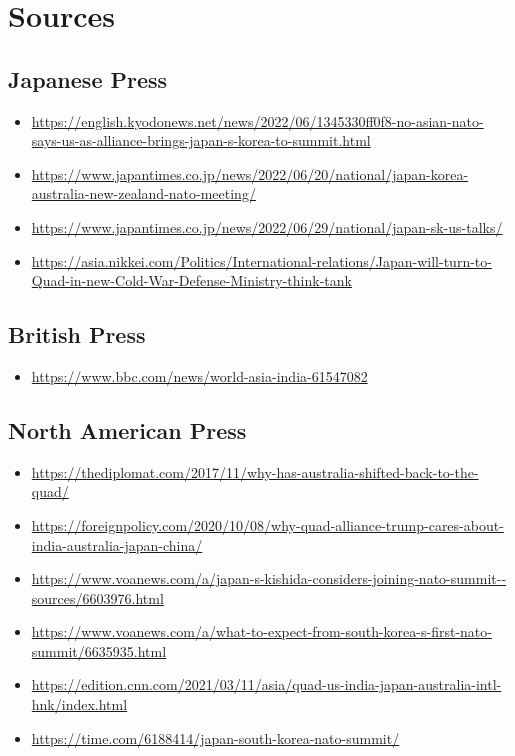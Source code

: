 \documentclass[11pt,a4paper]{article}
\begin{document}
\section{Sources}
\small

\subsection*{Japanese Press}
  \begin{itemize}[leftmargin=1.3em,itemsep=.18em,topsep=.25em]
    \item \url{https://english.kyodonews.net/news/2022/06/1345330ff0f8-no-asian-nato-says-us-as-alliance-brings-japan-s-korea-to-summit.html}
    \item \url{https://www.japantimes.co.jp/news/2022/06/20/national/japan-korea-australia-new-zealand-nato-meeting/}
    \item \url{https://www.japantimes.co.jp/news/2022/06/29/national/japan-sk-us-talks/}
    \item \url{https://asia.nikkei.com/Politics/International-relations/Japan-will-turn-to-Quad-in-new-Cold-War-Defense-Ministry-think-tank}
  \end{itemize}
\subsection*{British Press}
  \begin{itemize}[leftmargin=1.3em,itemsep=.18em,topsep=.25em]
    \item \url{https://www.bbc.com/news/world-asia-india-61547082}
  \end{itemize}
\subsection*{North American Press}
  \begin{itemize}[leftmargin=1.3em,itemsep=.18em,topsep=.25em]
    \item \url{https://thediplomat.com/2017/11/why-has-australia-shifted-back-to-the-quad/}
    \item \url{https://foreignpolicy.com/2020/10/08/why-quad-alliance-trump-cares-about-india-australia-japan-china/}
    \item \url{https://www.voanews.com/a/japan-s-kishida-considers-joining-nato-summit--sources/6603976.html}
    \item \url{https://www.voanews.com/a/what-to-expect-from-south-korea-s-first-nato-summit/6635935.html}
    \item \url{https://edition.cnn.com/2021/03/11/asia/quad-us-india-japan-australia-intl-hnk/index.html}
    \item \url{https://time.com/6188414/japan-south-korea-nato-summit/}
  \end{itemize}
\end{document}
